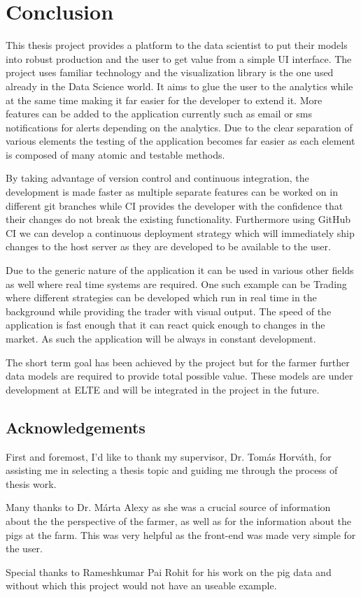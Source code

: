 \chapter{Conclusion} %
\label{ch:conclusion}

This thesis project provides a platform to the data scientist to put their
models into robust production and the user to get value from a simple UI
interface. The project uses familiar technology and the visualization library is
the one used already in the Data Science world. It aims to glue the user to the
analytics while at the same time making it far easier for the developer to
extend it. More features can be added to the application currently such as email
or sms notifications for alerts depending on the analytics. Due to the clear
separation of various elements the testing of the application becomes far easier
as each element is composed of many atomic and testable methods.

By taking advantage of version control and continuous integration, the
development is made faster as multiple separate features can be worked on in
different git branches while CI provides the developer with the confidence that
their changes do not break the existing functionality. Furthermore using GitHub
CI we can develop a continuous deployment strategy which will immediately ship
changes to the host server as they are developed to be available to the user.

Due to the generic nature of the application it can be used in various other
fields as well where real time systems are required. One such example can be
Trading where different strategies can be developed which run in real time in
the background while providing the trader with visual output. The speed of the
application is fast enough that it can react quick enough to changes in the
market. As such the application will be always in constant development.

The short term goal has been achieved by the project but for the farmer
further data models are required to provide total possible value. These models
are under development at ELTE and will be integrated in the project in the
future.

\section*{Acknowledgements}
First and foremost, I'd like to thank my supervisor, Dr. Tomás Horváth, for
assisting me in selecting a thesis topic and guiding me through the process of
thesis work.

Many thanks to Dr. Márta Alexy as she was a crucial source of information about
the the perspective of the farmer, as well as for the information about the pigs
at the farm. This was very helpful as the front-end was made very simple for the
user.

Special thanks to Rameshkumar Pai Rohit for his work on the pig data and without
which this project would not have an useable example.